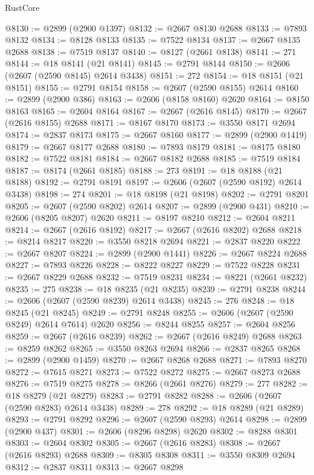 \begin{lexlean}{RustCore}
\begin{coremodule}
@8130 := @2899 (@2900 @1397)
@8132 := @2667 @8130 @2688
@8133 := @7893 @8132
@8134 := @8128 @8133
@8135 := @7522 @8134
@8137 := @2667 @8135 @2688
@8138 := @7519 @8137
@8140 := @8127 (@2661 @8138)
@8141 := 271
@8144 := @18 @8141 (@21 @8141)
@8145 := @2791 @8144
@8150 := @2606 (@2607 (@2590 @8145) @2614 @3438)
@8151 := 272
@8154 := @18 @8151 (@21 @8151)
@8155 := @2791 @8154
@8158 := @2607 (@2590 @8155) @2614
@8160 := @2899 (@2900 @386)
@8163 := @2606 (@8158 @8160) @2620
@8164 := @8150 @8163
@8165 := @2604 @8164
@8167 := @2667 (@2616 @8145)
@8170 := @2667 (@2616 @8155) @2688
@8171 := @8167 @8170
@8173 := @3550 @8171 @2694
@8174 := @2837 @8173
@8175 := @2667 @8160
@8177 := @2899 (@2900 @1419)
@8179 := @2667 @8177 @2688
@8180 := @7893 @8179
@8181 := @8175 @8180
@8182 := @7522 @8181
@8184 := @2667 @8182 @2688
@8185 := @7519 @8184
@8187 := @8174 (@2661 @8185)
@8188 := 273
@8191 := @18 @8188 (@21 @8188)
@8192 := @2791 @8191
@8197 := @2606 (@2607 (@2590 @8192) @2614 @3438)
@8198 := 274
@8201 := @18 @8198 (@21 @8198)
@8202 := @2791 @8201
@8205 := @2607 (@2590 @8202) @2614
@8207 := @2899 (@2900 @431)
@8210 := @2606 (@8205 @8207) @2620
@8211 := @8197 @8210
@8212 := @2604 @8211
@8214 := @2667 (@2616 @8192)
@8217 := @2667 (@2616 @8202) @2688
@8218 := @8214 @8217
@8220 := @3550 @8218 @2694
@8221 := @2837 @8220
@8222 := @2667 @8207
@8224 := @2899 (@2900 @1441)
@8226 := @2667 @8224 @2688
@8227 := @7893 @8226
@8228 := @8222 @8227
@8229 := @7522 @8228
@8231 := @2667 @8229 @2688
@8232 := @7519 @8231
@8234 := @8221 (@2661 @8232)
@8235 := 275
@8238 := @18 @8235 (@21 @8235)
@8239 := @2791 @8238
@8244 := @2606 (@2607 (@2590 @8239) @2614 @3438)
@8245 := 276
@8248 := @18 @8245 (@21 @8245)
@8249 := @2791 @8248
@8255 := @2606 (@2607 (@2590 @8249) @2614 @7614) @2620
@8256 := @8244 @8255
@8257 := @2604 @8256
@8259 := @2667 (@2616 @8239)
@8262 := @2667 (@2616 @8249) @2688
@8263 := @8259 @8262
@8265 := @3550 @8263 @2694
@8266 := @2837 @8265
@8268 := @2899 (@2900 @1459)
@8270 := @2667 @8268 @2688
@8271 := @7893 @8270
@8272 := @7615 @8271
@8273 := @7522 @8272
@8275 := @2667 @8273 @2688
@8276 := @7519 @8275
@8278 := @8266 (@2661 @8276)
@8279 := 277
@8282 := @18 @8279 (@21 @8279)
@8283 := @2791 @8282
@8288 := @2606 (@2607 (@2590 @8283) @2614 @3438)
@8289 := 278
@8292 := @18 @8289 (@21 @8289)
@8293 := @2791 @8292
@8296 := @2607 (@2590 @8293) @2614
@8298 := @2899 (@2900 @437)
@8301 := @2606 (@8296 @8298) @2620
@8302 := @8288 @8301
@8303 := @2604 @8302
@8305 := @2667 (@2616 @8283)
@8308 := @2667 (@2616 @8293) @2688
@8309 := @8305 @8308
@8311 := @3550 @8309 @2694
@8312 := @2837 @8311
@8313 := @2667 @8298

\end{coremodule}
\end{lexlean}
